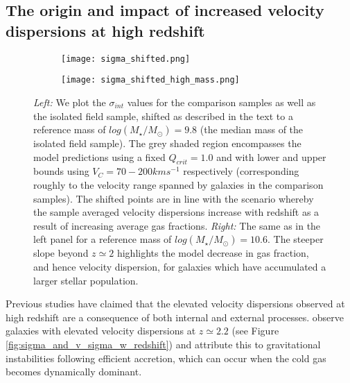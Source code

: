 \documentclass[fleqn,usenatbib]{mnras}
\begin{document}
\subsection{The origin and impact of increased velocity dispersions at high redshift}\label{discussion_increase_in_sigma}

\begin{figure*}
    \centering \hspace{-1.3cm}
    \begin{subfigure}[h!]{0.5\textwidth}
        \centering
        \texttt{[image: sigma\_shifted.png]}
    \end{subfigure} \hspace{+0.4cm}
    \begin{subfigure}[h!]{0.5\textwidth}
        \centering
        \texttt{[image: sigma\_shifted\_high\_mass.png]}
    \end{subfigure}
    \caption{{\it Left:} We plot the $\sigma_{int}$ values for the comparison samples as well as the isolated field sample, shifted as described in the text to a reference mass of $log(M_{\star}/M_{\odot}) = 9.8$ (the median mass of the isolated field sample).
    The grey shaded region encompasses the model predictions using a fixed $Q_{crit} = 1.0$ and with lower and upper bounds using $V_{C} = 70-200kms^{-1}$ respectively (corresponding roughly to the velocity range spanned by galaxies in the comparison samples).
    The shifted points are in line with the scenario whereby the sample averaged velocity dispersions increase with redshift as a result of increasing average gas fractions. 
    {\it Right:} The same as in the left panel for a reference mass of $log(M_{\star}/M_{\odot}) = 10.6$.
    The steeper slope beyond $z\simeq2$ highlights the model decrease in gas fraction, and hence velocity dispersion, for galaxies which have accumulated a larger stellar population.}
    \label{fig:sigma_shifted}
\end{figure*}

Previous studies have claimed that the elevated velocity dispersions observed at high redshift are a consequence of both internal and external processes.
\cite{Law2009} observe galaxies with elevated velocity dispersions at $z\simeq2.2$ (see Figure \ref{fig:sigma_and_v_sigma_w_redshift}) and attribute this to gravitational instabilities following efficient accretion, which can occur when the cold gas becomes dynamically dominant.
\end{document}
